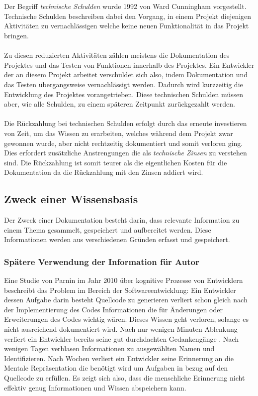\documentclass[a4paper,12pt]{scrartcl}
\begin{document}
\\\\
Der Begriff \textit{technische Schulden} wurde 1992 von Ward Cunningham vorgestellt. Technische Schulden beschreiben dabei den Vorgang, in einem Projekt diejenigen Aktivitäten zu vernachlässigen welche keine neuen Funktionalität in das Projekt bringen. 
\\\\
Zu diesen reduzierten Aktivitäten zählen meistens die Dokumentation des Projektes und das Testen von Funktionen innerhalb des Projektes. Ein Entwickler der an diesem Projekt arbeitet verschuldet sich also, indem Dokumentation und das Testen übergangsweise vernachlässigt werden. Dadurch wird kurzzeitig die Entwicklung des Projektes vorangetrieben. Diese technischen Schulden müssen aber, wie alle Schulden, zu einem späteren Zeitpunkt zurückgezahlt werden. 
\\\\
Die Rückzahlung bei technischen Schulden erfolgt durch das erneute investieren von Zeit, um das Wissen zu erarbeiten, welches während dem Projekt zwar gewonnen wurde, aber nicht rechtzeitig dokumentiert und somit verloren ging. Dies erfordert zusätzliche Anstrengungen die als \textit{technische Zinsen} zu verstehen sind. Die Rückzahlung ist somit teurer als die eigentlichen Kosten für die Dokumentation da die Rückzahlung mit den Zinsen addiert wird.

\subsection{Zweck einer Wissensbasis}
Der Zweck einer Dokumentation besteht darin, dass relevante Information zu einem Thema gesammelt, gespeichert und aufbereitet werden. Diese Informationen werden aus verschiedenen Gründen erfasst und gespeichert.

\subsubsection{Spätere Verwendung der Information für Autor}
Eine Studie von Parnin im Jahr 2010 \cite{Parnin2010} über kognitive Prozesse von Entwicklern beschreibt das Problem im Bereich der Softwareentwicklung: Ein Entwickler dessen Aufgabe darin besteht Quellcode zu generieren verliert schon gleich nach der Implementierung des Codes Informationen die für Änderungen oder Erweiterungen des Codes wichtig wären. Dieses Wissen geht verloren, solange es nicht ausreichend dokumentiert wird. Nach nur wenigen Minuten Ablenkung verliert ein Entwickler bereits seine gut durchdachten Gedankengänge \cite{Graham2004}. Nach wenigen Tagen verblasen Informationen zu ausgewählten Namen und Identifizieren. Nach Wochen verliert ein Entwickler seine Erinnerung an die Mentale Repräsentation die benötigt wird um Aufgaben in bezug auf den Quellcode zu erfüllen. Es zeigt sich also, dass die menschliche Erinnerung nicht effektiv genug Informationen und Wissen abspeichern kann.
\end{document}
